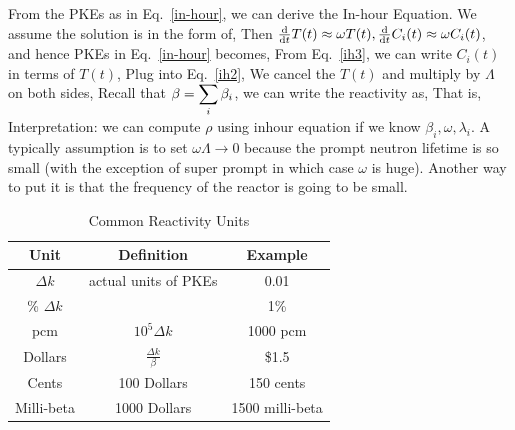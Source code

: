 \documentclass{school-22.211-notes}
\begin{document}
From the PKEs as in Eq.~\ref{in-hour}, we can derive the In-hour Equation. We assume the solution is in the form of,
Then $\frac{\mathrm{d}}{\mathrm{d}t} T(t) \approx \omega T(t), \frac{\mathrm{d}}{\mathrm{d}t} C_i(t) \approx \omega C_i(t)$, and hence PKEs in Eq.~\ref{in-hour} becomes, 
From Eq.~\ref{ih3}, we can write $C_i(t)$ in terms of $T(t)$, 
Plug into Eq.~\ref{ih2}, 
We cancel the $T(t)$ and multiply by $\Lambda$ on both sides,  
Recall that $\beta = \displaystyle\sum_i \beta_i$, we can write the reactivity as, 
That is, 
Interpretation: we can compute $\rho$ using inhour equation if we know $\beta_i, \omega, \lambda_i$. 
A typically assumption is to set $\omega \Lambda \to 0$ because the prompt neutron lifetime is so small (with the exception of super prompt in which case $\omega$ is huge). Another way to put it is that the frequency of the reactor is going to be small. 


\begin{table}[ht]
  \centering
  \begin{tabular}{|c|c|c|} \hline
    Unit & Definition & Example \\ \hline
    $\Delta k$ & actual units of PKEs & 0.01 \\
    \% $\Delta k$ & & 1\% \\
    pcm & $10^5 \Delta k $ & 1000 pcm \\ \hline
    Dollars & $\frac{\Delta k}{\beta}$ & \$1.5 \\
    Cents & 100 Dollars & 150 cents \\ 
    Milli-beta & 1000 Dollars & 1500 milli-beta \\ \hline
  \end{tabular}
  \caption{Common Reactivity Units}
\end{table}
\end{document}
